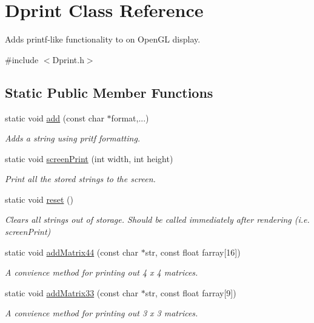 \hypertarget{class_dprint}{\section{Dprint Class Reference}
\label{class_dprint}
}


Adds printf-\/like functionality to on Open\-G\-L display.  




{\ttfamily \#include $<$Dprint.\-h$>$}

\subsection*{Static Public Member Functions}
\begin{DoxyCompactItemize}
\item 
static void \hyperlink{class_dprint_acdbb52c53803d5f44fe340b6be8103e2}{add} (const char $\ast$format,...)
\begin{DoxyCompactList}\small\item\em Adds a string using pritf formatting. \end{DoxyCompactList}\item 
static void \hyperlink{class_dprint_af6eef0dd502444c9aa3fb8bb03f72f79}{screen\-Print} (int width, int height)
\begin{DoxyCompactList}\small\item\em Print all the stored strings to the screen. \end{DoxyCompactList}\item 
static void \hyperlink{class_dprint_a39cc3c349ebcddfab329005972fbf9b3}{reset} ()
\begin{DoxyCompactList}\small\item\em Clears all strings out of storage. Should be called immediately after rendering (i.\-e. screen\-Print) \end{DoxyCompactList}\item 
static void \hyperlink{class_dprint_a17c3123f32889461fd68fa9ba269fcb3}{add\-Matrix44} (const char $\ast$str, const float farray\mbox{[}16\mbox{]})
\begin{DoxyCompactList}\small\item\em A convience method for printing out 4 x 4 matrices. \end{DoxyCompactList}\item 
static void \hyperlink{class_dprint_af5a825194bc234eeb0fc30365b9d719e}{add\-Matrix33} (const char $\ast$str, const float farray\mbox{[}9\mbox{]})
\begin{DoxyCompactList}\small\item\em A convience method for printing out 3 x 3 matrices. \end{DoxyCompactList}\end{DoxyCompactItemize}
